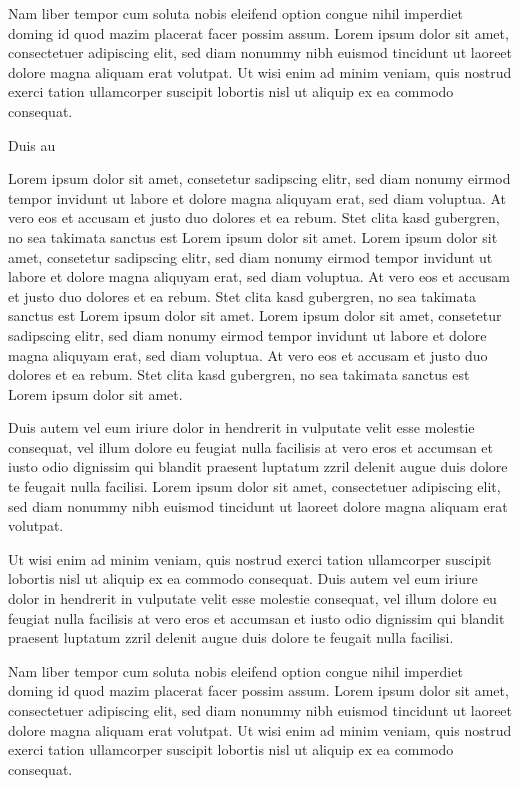Nam liber tempor cum soluta nobis eleifend option congue nihil imperdiet doming id quod mazim placerat facer possim
assum. Lorem ipsum dolor sit amet, consectetuer adipiscing elit, sed diam nonummy nibh euismod tincidunt ut laoreet
dolore magna aliquam erat volutpat. Ut wisi enim ad minim veniam, quis nostrud exerci tation ullamcorper suscipit
lobortis nisl ut aliquip ex ea commodo consequat.

Duis au



Lorem ipsum dolor sit amet, consetetur sadipscing elitr, sed diam nonumy eirmod tempor invidunt ut labore et dolore
magna aliquyam erat, sed diam voluptua. At vero eos et accusam et justo duo dolores et ea rebum. Stet clita kasd
gubergren, no sea takimata sanctus est Lorem ipsum dolor sit amet. Lorem ipsum dolor sit amet, consetetur sadipscing
elitr, sed diam nonumy eirmod tempor invidunt ut labore et dolore magna aliquyam erat, sed diam voluptua. At vero eos
et accusam et justo duo dolores et ea rebum. Stet clita kasd gubergren, no sea takimata sanctus est Lorem ipsum dolor
sit amet. Lorem ipsum dolor sit amet, consetetur sadipscing elitr, sed diam nonumy eirmod tempor invidunt ut labore
et dolore magna aliquyam erat, sed diam voluptua. At vero eos et accusam et justo duo dolores et ea rebum. Stet clita
kasd gubergren, no sea takimata sanctus est Lorem ipsum dolor sit amet.

Duis autem vel eum iriure dolor in hendrerit in vulputate velit esse molestie consequat, vel illum dolore eu feugiat
nulla facilisis at vero eros et accumsan et iusto odio dignissim qui blandit praesent luptatum zzril delenit augue
duis dolore te feugait nulla facilisi. Lorem ipsum dolor sit amet, consectetuer adipiscing elit, sed diam nonummy
nibh euismod tincidunt ut laoreet dolore magna aliquam erat volutpat.

Ut wisi enim ad minim veniam, quis nostrud exerci tation ullamcorper suscipit lobortis nisl ut aliquip ex ea commodo
consequat. Duis autem vel eum iriure dolor in hendrerit in vulputate velit esse molestie consequat, vel illum dolore
eu feugiat nulla facilisis at vero eros et accumsan et iusto odio dignissim qui blandit praesent luptatum zzril
delenit augue duis dolore te feugait nulla facilisi.

Nam liber tempor cum soluta nobis eleifend option congue nihil imperdiet doming id quod mazim placerat facer possim
assum. Lorem ipsum dolor sit amet, consectetuer adipiscing elit, sed diam nonummy nibh euismod tincidunt ut laoreet
dolore magna aliquam erat volutpat. Ut wisi enim ad minim veniam, quis nostrud exerci tation ullamcorper suscipit
lobortis nisl ut aliquip ex ea commodo consequat.

